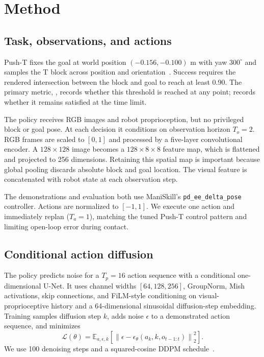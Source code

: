 \section{Method}

\subsection{Task, observations, and actions}

Push-T fixes the goal at world position $(-0.156,-0.100)$ m with yaw $300^\circ$ and samples the
T block across position and orientation~\cite{maniskill_pusht}. Success requires the rendered
intersection between the block and goal to reach at least 0.90. The primary metric,
\successonce, records whether this threshold is reached at any point; \successend records whether
it remains satisfied at the time limit.

The policy receives RGB images and robot proprioception, but no privileged block or goal pose. At
each decision it conditions on observation horizon $T_o=2$. RGB frames are scaled to $[0,1]$ and
processed by a five-layer convolutional encoder. A $128\!\times\!128$ image becomes a
$128\!\times\!8\!\times\!8$ feature map, which is flattened and projected to 256 dimensions.
Retaining this spatial map is important because global pooling discards absolute block and goal
location. The visual feature is concatenated with robot state at each observation step.

The demonstrations and evaluation both use ManiSkill's \texttt{pd\_ee\_delta\_pose} controller.
Actions are normalized to $[-1,1]$. We execute one action and immediately replan
($T_a=1$), matching the tuned Push-T control pattern and limiting open-loop error during contact.

\subsection{Conditional action diffusion}

The policy predicts noise for a $T_p=16$ action sequence with a conditional one-dimensional
U-Net. It uses channel widths $[64,128,256]$, GroupNorm, Mish activations, skip connections, and
FiLM-style conditioning on visual-proprioceptive history and a 64-dimensional sinusoidal
diffusion-step embedding. Training samples diffusion step $k$, adds noise $\epsilon$ to a
demonstrated action sequence, and minimizes
\begin{equation}
    \mathcal{L}(\theta)=
    \mathbb{E}_{a,\epsilon,k}\!
    \left[\left\|\epsilon-\epsilon_\theta(a_k,k,o_{t-1:t})\right\|_2^2\right].
\end{equation}
We use 100 denoising steps and a squared-cosine DDPM schedule~\cite{nichol2021improved}.

